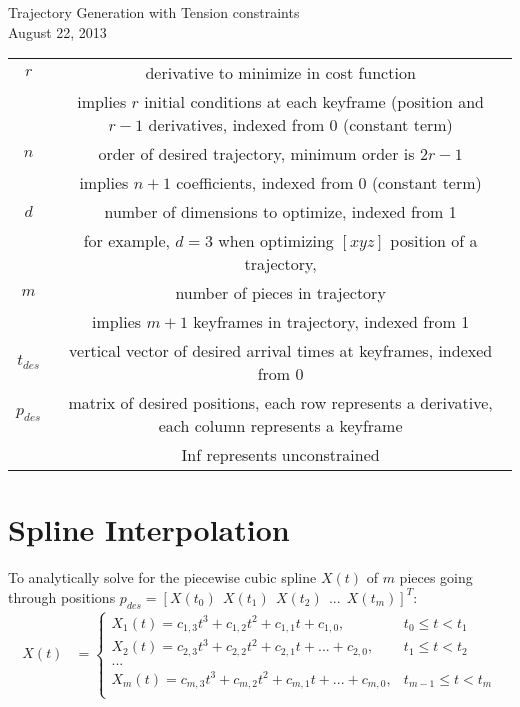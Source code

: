 \documentclass[11pt]{article}
\begin{document}
\centering
Trajectory Generation with Tension constraints \\
August 22, 2013

\raggedright

\begin{table} [h!]
\footnotesize
\begin{tabular}{ c c }
	$r$ & derivative to minimize in cost function \\
		& implies $r$ initial conditions at each keyframe (position and $r-1$ derivatives, indexed from 0 (constant term) \\
	$n$ & order of desired trajectory, minimum order is $2r-1$ \\
		&  implies $n+1$ coefficients, indexed from 0 (constant term) \\
	$d$ & number of dimensions to optimize, indexed from 1 \\
	 	& for example, $d=3$ when optimizing $[x y z]$ position of a trajectory,  \\
	$m$ & number of pieces in trajectory \\
		& implies $m+1$ keyframes in trajectory, indexed from 1 \\
	$t_{des}$ & vertical vector of desired arrival times at keyframes, indexed from 0 \\
	$p_{des}$ & matrix of desired positions, each row represents a derivative, each column represents a keyframe \\
		&  Inf represents unconstrained 
\end{tabular}
\label{tab: vars}
\end{table}




\newpage
\small



\section{Spline Interpolation}

To analytically solve for the piecewise cubic spline $X(t)$ of $m$ pieces going through positions $p_{des} =  [X(t_0) \ \ X(t_1) \ \ X(t_2) \ \ ... \ \ X(t_m)]^T$:
\begin{align*}
X(t) &= 
\begin{cases}
    X_1 (t) = c_{1, 3} t^3 + c_{1, 2} t^2 + c_{1, 1} t + c_{1, 0}, & t_0 \le t < t_1 \\
    X_2 (t) = c_{2, 3} t^3 + c_{2, 2} t^2 + c_{2, 1} t + ... + c_{2, 0}, & t_1 \le t < t_2 \\
    ... \\
    X_m (t) = c_{m, 3} t^3 + c_{m, 2} t^2 + c_{m, 1} t + ... + c_{m, 0}, & t_{m-1} \le t < t_m \\
\end{cases}
\end{align*}
\end{document}
